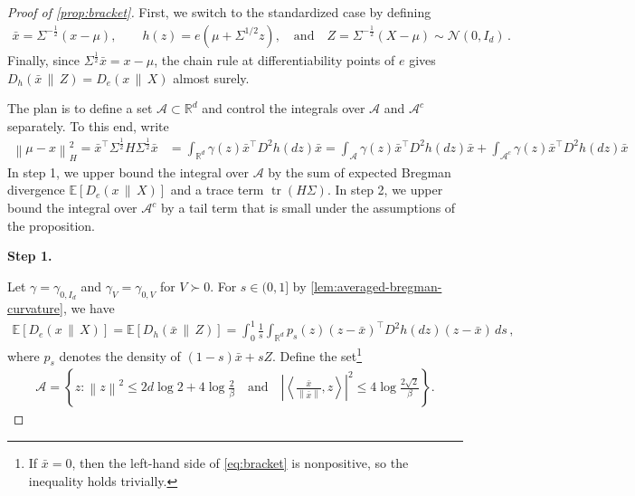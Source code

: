 \documentclass[11pt]{article}
\newcommand{\proofstepinline}[1]{%
    {\sffamily\bfseries\color{blue!55!black}Step #1.}\enspace
}
\newcommand{\R}{\mathbb R}
\newcommand{\E}{\mathbb E}
\newcommand{\N}{\mathcal N}
\newcommand{\tr}{\operatorname{tr}}
\newcommand{\1}{\mathbf 1}
\newcommand{\ip}[2]{\left\langle #1,#2\right\rangle}
\newcommand{\norm}[1]{\left\lVert #1\right\rVert}
\newcommand{\normm}[2]{\left\lVert #1\right\rVert_{#2}}
\begin{document}
\begin{proof}[Proof of \cref{prop:bracket}]
    First, we switch to the standardized case by defining
    \begin{align}
        \bar{x}=\Sigma^{-\frac12}(x-\mu),
        \qquad
        h(z)=e(\mu+\Sigma^{1/2}z),
        \quad\text{and}
        \quad
        Z=\Sigma^{-\frac12}(X - \mu) \sim \N(0,I_d)\,.
    \end{align}
    Finally, since $\Sigma^{\frac12}\bar{x}=x-\mu$, the chain rule at
    differentiability points of $e$ gives
    $D_h(\bar{x}\,\|\,Z)=D_e(x\,\|\,X)$
    almost surely.

    The plan is to define a set $\mathcal A\subset \R^d$ and control the integrals over $\mathcal A$ and $\mathcal A^c$ separately.
    To this end, write
    \begin{align}
        \normm{\mu-x}{H}^2
        =
        \bar{x}^\top \Sigma^{\frac12}H\Sigma^{\frac12}\bar{x}
         & =
        \int_{\R^d}\gamma(z)\bar{x}^\top D^2h(dz)\bar{x}
        =
        \int_{\mathcal A}\gamma(z)\bar{x}^\top D^2h(dz)\bar{x}
        +
        \int_{\mathcal A^c}\gamma(z)\bar{x}^\top D^2h(dz)\bar{x}
        \label{eq:standardized-comparator-curvature}
    \end{align}
    In step 1, we upper bound the integral over $\mathcal A$ by the sum of expected Bregman divergence $\E[D_e(x\,\|\,X)]$ and a trace term $\tr(H\Sigma)$.
    In step 2, we upper bound the integral over $\mathcal A^c$ by a tail term that is small under the assumptions of the proposition.

    \proofstepinline{1}
    Let $\gamma=\gamma_{0,I_d}$ and $\gamma_V=\gamma_{0,V}$ for $V\succ0$.
    For $s\in(0,1]$ by \cref{lem:averaged-bregman-curvature},
    we have
    \begin{align}
        \E[D_e(x\,\|\,X)]
        =
        \E[D_h(\bar{x}\,\|\,Z)]
        =
        \int_0^1\frac1s
        \int_{\R^d}
        p_s(z)(z-\bar{x})^\top D^2h(dz)(z-\bar{x})\,ds\,,
        \label{eq:bregman-density}
    \end{align}
    where $p_s$ denotes the density of $(1-s)\bar{x}+sZ$.
    Define the set\footnote{
        If $\bar{x}=0$, then the left-hand side of \eqref{eq:bracket} is nonpositive, so the inequality holds trivially.
    }
    \begin{align}
        \mathcal A=\left\{z:
        \norm{z}^2\leq2d\log2+4\log\frac2\beta
        \quad
        \text{and}
        \quad
        \left|\ip{\frac{\bar{x}}{\norm{\bar{x}}}}{z}\right|^2
        \leq4\log\frac{2\sqrt2}{\beta}
        \right\}.
        \label{eq:A}
    \end{align}


\end{proof}
\end{document}
